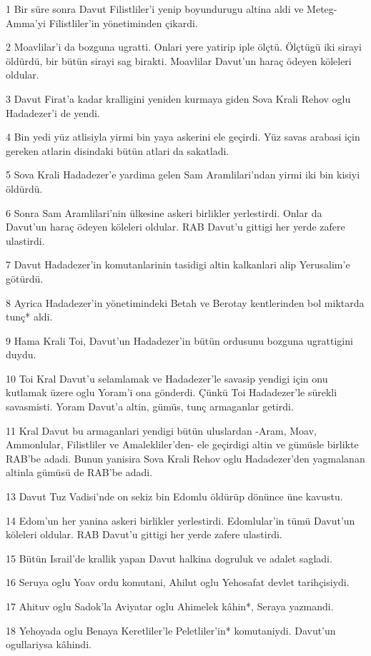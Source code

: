 \par 1 Bir süre sonra Davut Filistliler'i yenip boyundurugu altina aldi ve Meteg-Amma'yi Filistliler'in yönetiminden çikardi.
\par 2 Moavlilar'i da bozguna ugratti. Onlari yere yatirip iple ölçtü. Ölçtügü iki sirayi öldürdü, bir bütün sirayi sag birakti. Moavlilar Davut'un haraç ödeyen köleleri oldular.
\par 3 Davut Firat'a kadar kralligini yeniden kurmaya giden Sova Krali Rehov oglu Hadadezer'i de yendi.
\par 4 Bin yedi yüz atlisiyla yirmi bin yaya askerini ele geçirdi. Yüz savas arabasi için gereken atlarin disindaki bütün atlari da sakatladi.
\par 5 Sova Krali Hadadezer'e yardima gelen Sam Aramlilari'ndan yirmi iki bin kisiyi öldürdü.
\par 6 Sonra Sam Aramlilari'nin ülkesine askeri birlikler yerlestirdi. Onlar da Davut'un haraç ödeyen köleleri oldular. RAB Davut'u gittigi her yerde zafere ulastirdi.
\par 7 Davut Hadadezer'in komutanlarinin tasidigi altin kalkanlari alip Yerusalim'e götürdü.
\par 8 Ayrica Hadadezer'in yönetimindeki Betah ve Berotay kentlerinden bol miktarda tunç* aldi.
\par 9 Hama Krali Toi, Davut'un Hadadezer'in bütün ordusunu bozguna ugrattigini duydu.
\par 10 Toi Kral Davut'u selamlamak ve Hadadezer'le savasip yendigi için onu kutlamak üzere oglu Yoram'i ona gönderdi. Çünkü Toi Hadadezer'le sürekli savasmisti. Yoram Davut'a altin, gümüs, tunç armaganlar getirdi.
\par 11 Kral Davut bu armaganlari yendigi bütün uluslardan -Aram, Moav, Ammonlular, Filistliler ve Amalekliler'den- ele geçirdigi altin ve gümüsle birlikte RAB'be adadi. Bunun yanisira Sova Krali Rehov oglu Hadadezer'den yagmalanan altinla gümüsü de RAB'be adadi.
\par 13 Davut Tuz Vadisi'nde on sekiz bin Edomlu öldürüp dönünce üne kavustu.
\par 14 Edom'un her yanina askeri birlikler yerlestirdi. Edomlular'in tümü Davut'un köleleri oldular. RAB Davut'u gittigi her yerde zafere ulastirdi.
\par 15 Bütün Israil'de krallik yapan Davut halkina dogruluk ve adalet sagladi.
\par 16 Seruya oglu Yoav ordu komutani, Ahilut oglu Yehosafat devlet tarihçisiydi.
\par 17 Ahituv oglu Sadok'la Aviyatar oglu Ahimelek kâhin*, Seraya yazmandi.
\par 18 Yehoyada oglu Benaya Keretliler'le Peletliler'in* komutaniydi. Davut'un ogullariysa kâhindi.

